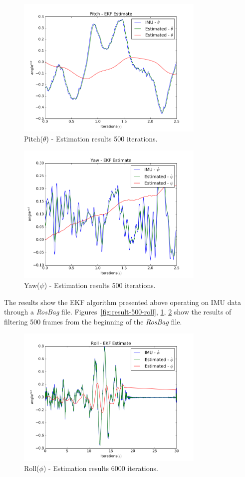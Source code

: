 \documentclass[letter]{IEEEtran}
\begin{document}
\begin{figure}
\centering
\includegraphics[width=9cm]{pitch-result-500-s}
\caption{Pitch($\theta$) - Estimation results 500 iterations.}
\label{fig:result-500-pitch}
\end{figure}

\begin{figure}
\centering
\includegraphics[width=9cm]{yaw-result-500-s}
\caption{Yaw($\psi$) - Estimation results 500 iterations.}
\label{fig:result-500-yaw}
\end{figure}

The results show the EKF algorithm presented above operating on IMU data through a \emph{RosBag} file. Figures~\ref{fig:result-500-roll}, \ref{fig:result-500-pitch}, \ref{fig:result-500-yaw} show the results of filtering 500 frames from the beginning of the \emph{RosBag} file.

\begin{figure}
\centering
\includegraphics[width=9cm]{roll-result-6000-s}
\caption{Roll($\phi$) - Estimation results 6000 iterations.}
\label{fig:result-6000-roll}
\end{figure}
\end{document}

